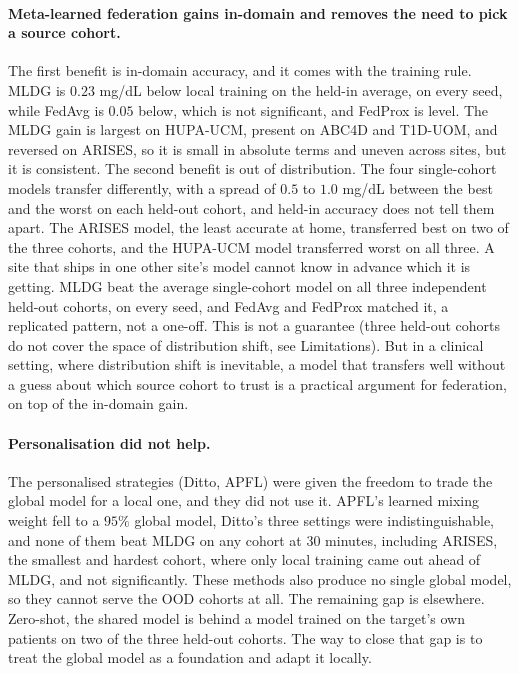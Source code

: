 \documentclass[10pt,letterpaper]{article}
\begin{document}
\paragraph{Meta-learned federation gains in-domain and removes the need to
pick a source cohort.} The first benefit is in-domain accuracy, and it comes
with the training rule. MLDG is $0.23$ mg/dL below local training on the
held-in average, on every seed, while FedAvg is $0.05$ below, which is not
significant, and FedProx is level. The MLDG gain is largest on HUPA-UCM,
present on ABC4D and T1D-UOM, and reversed on ARISES, so it is small in
absolute terms and uneven across sites, but it is consistent. The second
benefit is out of distribution. The four single-cohort models transfer
differently, with a spread of $0.5$ to $1.0$ mg/dL between the best and the
worst on each held-out cohort, and
held-in accuracy does not tell them apart. The ARISES model, the least
accurate at home, transferred best on two of the three cohorts, and the
HUPA-UCM model transferred worst on all three. A site that ships in one other
site's model cannot know in advance which it is getting. MLDG beat the
average single-cohort model on all three independent held-out cohorts, on
every seed, and FedAvg and FedProx matched it, a replicated pattern, not a
one-off. This is not a guarantee (three held-out cohorts do
not cover the space of distribution shift, see Limitations). But in a
clinical setting, where distribution shift is inevitable, a model that
transfers well without a guess about which source cohort to trust is a
practical argument for federation, on top of the in-domain gain.

\paragraph{Personalisation did not help.} The personalised strategies
(Ditto, APFL) were given the freedom to trade the global model for a local
one, and they did not use it. APFL's learned mixing weight fell to a $95\%$
global model, Ditto's three settings were indistinguishable, and none of
them beat MLDG on any cohort at 30 minutes, including ARISES, the smallest
and hardest cohort, where only local training came out ahead of MLDG, and
not significantly. These methods also
produce no single global model, so they cannot serve the OOD cohorts at all.
The remaining gap is elsewhere. Zero-shot, the shared model is behind a
model trained on the target's own patients on two of the three held-out
cohorts. The way to close that gap is to treat the global model as a
foundation and adapt it locally.
\end{document}
